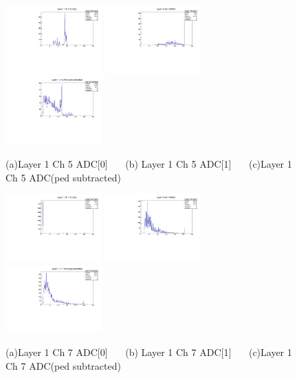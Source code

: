 \documentclass[a4paper,11pt]{article}
\theoremstyle{mytheor}
\begin{document}
\begin{figure}[H] 
\vspace*{-0.3cm} 
\includegraphics[width=0.33\textwidth,scale=0.5,trim=0 0 0 0,clip]{plotsdir/file0_muons-Layer1_Ch5_adc0-1.pdf} 
\includegraphics[width=0.33\textwidth,scale=0.5,trim=0 0 0 0,clip]{plotsdir/file0_muons-Layer1_Ch5_adc1-1.pdf} 
\includegraphics[width=0.33\textwidth,scale=0.5,trim=0 0 0 0,clip]{plotsdir/file0_muons-Layer1_Ch5_adcPedsub-1.pdf} 
\caption{(a)Layer 1 Ch 5 ADC[0] ~~~(b) Layer 1 Ch 5 ADC[1] ~~~(c)Layer 1 Ch 5 ADC(ped subtracted) } 
\end{figure} 
\begin{figure}[H] 
\vspace*{-0.3cm} 
\includegraphics[width=0.33\textwidth,scale=0.5,trim=0 0 0 0,clip]{plotsdir/file0_muons-Layer1_Ch7_adc0-1.pdf} 
\includegraphics[width=0.33\textwidth,scale=0.5,trim=0 0 0 0,clip]{plotsdir/file0_muons-Layer1_Ch7_adc1-1.pdf} 
\includegraphics[width=0.33\textwidth,scale=0.5,trim=0 0 0 0,clip]{plotsdir/file0_muons-Layer1_Ch7_adcPedsub-1.pdf} 
\caption{(a)Layer 1 Ch 7 ADC[0] ~~~(b) Layer 1 Ch 7 ADC[1] ~~~(c)Layer 1 Ch 7 ADC(ped subtracted) } 
\end{figure} 
\end{document}

